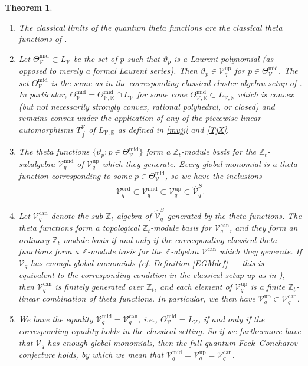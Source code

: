 \documentclass{amsart}
\DeclareMathOperator{\up}{up}
\DeclareMathOperator{\midd}{mid}
\DeclareMathOperator{\ord}{ord}
\DeclareMathOperator{\can}{can}
\let\bb=\mathbb
\let\s=\mathcal
\let\wh=\widehat
\newcommand {\Zt} {\Z_t}
\newcommand {\jj} {\vec{\jmath}}
\theoremstyle{plain}%
\newtheorem{thm}{Theorem}[section]
\newcommand{\Z}{{\mathbb Z}}
\theoremstyle{definition}
\theoremstyle{remark}
\begin{document}
\begin{thm}
    \label{MainThm2}
    \begin{enumerate}
    \item The classical limits of the quantum theta functions are the classical theta functions of \cite[Thm. 0.3]{GHKK}. 
    \item Let $\Theta_{\s{V}}^{\midd}\subset L_{\s{V}}$ be the set of $p$ such that $\vartheta_p$ is a Laurent polynomial (as opposed to merely a formal Laurent series). Then $\vartheta_p\in\s{V}_q^{\up}$ for $p\in \Theta_{\s{V}}^{\midd}$.  The set $\Theta_{\s{V}}^{\midd}$ is the same as in the corresponding classical cluster algebra setup of \cite[Thm. 0.3]{GHKK}.  In particular, $\Theta_{\s{V}}^{\midd}=\Theta^{\midd}_{\s{V},\bb{R}}\cap L_{\s{V}}$ for some cone $\Theta^{\midd}_{\s{V},\bb{R}}\subset L_{\s{V},\mathbb{R}}$ which is convex (but not necessarily strongly convex, rational polyhedral, or closed) and remains convex under the application of any of the piecewise-linear automorphisms $T_{\jj}^{\s{V}}$ of $L_{\s{V},\mathbb{R}}$ as defined in \eqref{mujj} and \eqref{TjX}.
    \item The theta functions $\{\vartheta_p\colon p\in \Theta_{\s{V}}^{\midd}\}$ form a $\Zt$-module basis for the $\Z_t$-subalgebra $\s{V}_q^{\midd}$ of $\s{V}_q^{\up}$ which they generate.  Every global monomial is a theta function corresponding to some $p\in \Theta_{\s{V}}^{\midd}$, so we have the inclusions
    \begin{align*}
        \s{V}_q^{\ord} \subset \s{V}_q^{\midd} \subset \s{V}_q^{\up} 
        \subset \wh{\s{V}}_q^S.
    \end{align*}
    \item Let $\s{V}_q^{\can}$ denote the sub $\Zt$-algebra of $\wh{\s{V}}_q^S$ generated by the theta functions.  The theta functions form a topological $\Zt$-module basis for $\s{V}_q^{\can}$, and they form an ordinary $\Zt$-module basis if and only if the corresponding classical theta functions form a $\Z$-module basis for the $\Z$-algebra $\s{V}^{\can}$ which they generate.  If $\s{V}_q$ has enough global monomials (cf. Definition \ref{EGMdef} --- this is equivalent to the corresponding condition in the classical setup up as in \cite[Def. 0.11]{GHKK}), then $\s{V}_q^{\can}$ is finitely generated over $\Zt$, and each element of $\s{V}_q^{\up}$ is a finite $\bb{Z}_t$-linear combination of theta functions.  In particular, we then have $\s{V}_q^{\up} \subset \s{V}_q^{\can}$. 
    \item We have the equality $\s{V}_q^{\midd}=\s{V}_q^{\can}$, i.e., $\Theta_{\s{V}}^{\midd}=L_{\s{V}}$, if and only if the corresponding equality holds in the classical setting.  So if we furthermore have that $\s{V}_q$ has enough global monomials, then the full quantum Fock--Goncharov conjecture holds, by which we mean that $\s{V}_q^{\midd}=\s{V}_q^{\up}=\s{V}_q^{\can}$.

\end{enumerate}
\end{thm}
\end{document}
